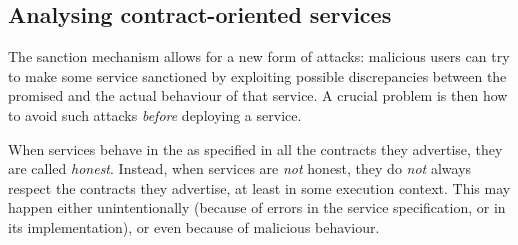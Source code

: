 \subsection*{Analysing contract-oriented services}

The sanction mechanism
allows for a new form of attacks: 
malicious users can try
to make some service sanctioned by exploiting possible discrepancies between
the promised and the actual behaviour of that service. %
A crucial problem is then
how to avoid such attacks \emph{before} deploying a service. %

When services behave in the as specified in all the contracts
they advertise,
they are called \emph{honest}. %
Instead, when services are \emph{not} honest,
they do \emph{not} always respect the contracts they advertise,
at least in some execution context. %
This may happen either unintentionally
(because of errors in the service specification, or in its implementation),
or even because of malicious behaviour.

